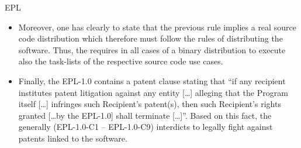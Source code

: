\begin{license}{EPL}
\begin{itemize}
  \item Moreover, one has clearly to state that the previous rule implies a real
    source code distribution which therefore must follow the rules of
    distributing the software. Thus, the \oslic{} requires in all cases of a binary 
    distribution to execute also the task-lists of the respective source code
    use cases. 
 
 	\item Finally, the EPL-1.0 contains a patent clause stating that \enquote{if
 	any recipient institutes patent litigation against any entity [\ldots]
 	alleging that the Program itself [\ldots] infringes such Recipient's
 	patent(s), then such Recipient's rights granted [\ldots by the EPL-1.0] shall
 	terminate [\ldots]}. Based on this fact, the \oslic{} generally
 	(EPL-1.0-C1 -- EPL-1.0-C9) interdicts to legally fight against patents linked to the software.
\end{itemize}
\end{license}

%

